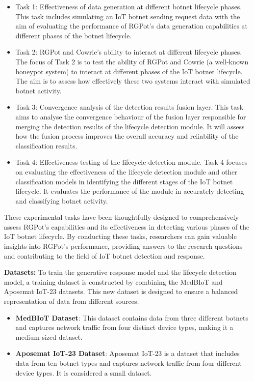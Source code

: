 \documentclass[journal]{IEEEtai}
\begin{document}
\begin{itemize}
    \item Task 1: Effectiveness of data generation at different botnet lifecycle phases.
    This task includes simulating an IoT botnet sending request data with the aim of evaluating the performance of RGPot's data generation capabilities at different phases of the botnet lifecycle.

    \item Task 2: RGPot and Cowrie's ability to interact at different lifecycle phases.
    The focus of Task 2 is to test the ability of RGPot and Cowrie (a well-known honeypot system) to interact at different phases of the IoT botnet lifecycle.
    The aim is to assess how effectively these two systems interact with simulated botnet activity.

    \item Task 3: Convergence analysis of the detection results fusion layer.
    This task aims to analyse the convergence behaviour of the fusion layer responsible for merging the detection results of the lifecycle detection module.
    It will assess how the fusion process improves the overall accuracy and reliability of the classification results.

    \item Task 4: Effectiveness testing of the lifecycle detection module.
    Task 4 focuses on evaluating the effectiveness of the lifecycle detection module and other classification models in identifying the different stages of the IoT botnet lifecycle.
    It evaluates the performance of the module in accurately detecting and classifying botnet activity.

\end{itemize}


These experimental tasks have been thoughtfully designed to comprehensively assess RGPot's capabilities and its effectiveness in detecting various phases of the IoT botnet lifecycle. 
By conducting these tasks, researchers can gain valuable insights into RGPot's performance, providing answers to the research questions and contributing to the field of IoT botnet detection and response.


\textbf{Datasets:}
To train the generative response model and the lifecycle detection model, a training dataset is constructed by combining the MedBIoT and Aposemat IoT-23 datasets. 
This new dataset is designed to ensure a balanced representation of data from different sources.

\begin{itemize}
    \item \textbf{MedBIoT Dataset}: This dataset contains data from three different botnets and captures network traffic from four distinct device types, making it a medium-sized dataset.

    \item \textbf{Aposemat IoT-23 Dataset}: Aposemat IoT-23 is a dataset that includes data from ten botnet types and captures network traffic from four different device types. 
    It is considered a small dataset.
\end{itemize}
\end{document}
